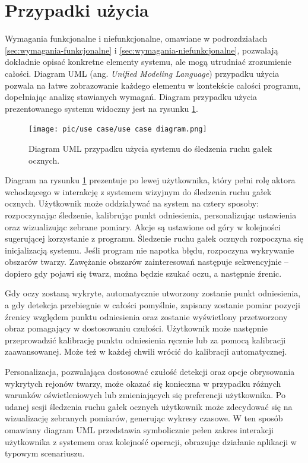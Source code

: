 \documentclass[a4paper,twoside,12pt]{book}
\newcommand{\obcy}[1]{\emph{#1}}
\newcommand{\english}[1]{{\selectlanguage{british}\obcy{#1}}}
\begin{document}
\section{Przypadki użycia}
\label{sec:przypadki-uzycia}

Wymagania funkcjonalne i niefunkcjonalne, omawiane w podrozdziałach \ref{sec:wymagania-funkcjonalne} i \ref{sec:wymagania-niefunkcjonalne}, pozwalają dokładnie opisać konkretne elementy systemu, ale mogą utrudniać zrozumienie całości. Diagram UML (ang. \english{Unified Modeling Language}) przypadku użycia pozwala na łatwe zobrazowanie każdego elementu w kontekście całości programu, dopełniając analizę stawianych wymagań. Diagram przypadku użycia prezentowanego systemu widoczny jest na rysunku \ref{fig:UML-use-case}. 

\begin{figure}[htbp]
	\centering
	\texttt{[image: pic/use case/use case diagram.png]}
	\caption{Diagram UML przypadku użycia systemu do śledzenia ruchu gałek ocznych.}
	\label{fig:UML-use-case}
\end{figure}

Diagram na rysunku \ref{fig:UML-use-case} prezentuje po lewej użytkownika, który pełni rolę aktora wchodzącego w interakcję z systemem wizyjnym do śledzenia ruchu gałek ocznych. Użytkownik może oddziaływać na system na cztery sposoby: rozpoczynając śledzenie, kalibrując punkt odniesienia, personalizując ustawienia oraz wizualizując zebrane pomiary. Akcje są ustawione od góry w kolejności sugerującej korzystanie z programu. Śledzenie ruchu gałek ocznych rozpoczyna się inicjalizacją systemu. Jeśli program nie napotka błędu, rozpoczyna wykrywanie obszarów twarzy. Zawężanie obszarów zainteresowań następuje sekwencyjnie – dopiero gdy pojawi się twarz, można będzie szukać oczu, a następnie źrenic.

Gdy oczy zostaną wykryte, automatycznie utworzony zostanie punkt odniesienia, a gdy detekcja przebiegnie w całości pomyślnie, zapisany zostanie pomiar pozycji źrenicy względem punktu odniesienia oraz zostanie wyświetlony przetworzony obraz pomagający w dostosowaniu czułości. Użytkownik może następnie przeprowadzić kalibrację punktu odniesienia ręcznie lub za pomocą kalibracji zaawansowanej. Może też w każdej chwili wrócić do kalibracji automatycznej.

Personalizacja, pozwalająca dostosować czułość detekcji oraz opcje obrysowania wykrytych rejonów twarzy, może okazać się konieczna w przypadku różnych warunków oświetleniowych lub zmieniających się preferencji użytkownika. Po udanej sesji śledzenia ruchu gałek ocznych użytkownik może zdecydować się na wizualizację zebranych pomiarów, generując wykresy czasowe. W ten sposób omawiany diagram UML przedstawia symbolicznie pełen zakres interakcji użytkownika z systemem oraz kolejność operacji, obrazując działanie aplikacji w typowym scenariuszu.
\end{document}
